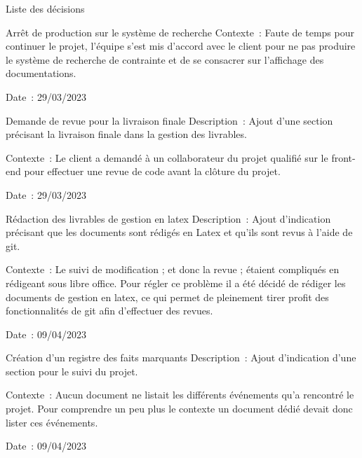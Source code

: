 \documentclass[]{article}
\begin{document}
{\begin{section}{Liste des décisions}
\begin{subsection}{Arrêt de production sur le système de recherche}
     Contexte : Faute de temps pour continuer le projet, l’équipe s’est mis d’accord avec le client pour ne pas produire le système de recherche de contrainte et de se consacrer sur l’affichage des documentations.

     Date : 29/03/2023
 \end{subsection}
 \newpage
 \begin{subsection}{Demande de revue pour la livraison finale}
     Description : Ajout d’une section précisant la livraison finale dans la gestion des livrables.

     Contexte : Le client a demandé à un collaborateur du projet qualifié sur le front-end pour effectuer une revue de code avant la clôture du projet.

     Date : 29/03/2023
 \end{subsection}

 \begin{subsection}{Rédaction des livrables de gestion en latex}
    Description : Ajout d'indication précisant que les documents sont rédigés en Latex et qu'ils sont revus à l'aide de git.

    Contexte : Le suivi de modification ; et donc la revue ; étaient compliqués en rédigeant sous libre office. Pour régler ce problème il a été décidé de rédiger les documents de gestion en latex, ce qui permet de pleinement tirer profit des fonctionnalités de git afin d'effectuer des revues.

    Date : 09/04/2023
\end{subsection}

\begin{subsection}{Création d'un registre des faits marquants}
    Description : Ajout d'indication d'une section pour le suivi du projet.

    Contexte : Aucun document ne listait les différents événements qu'a rencontré le projet. Pour comprendre un peu plus le contexte un document dédié devait donc lister ces événements.

    Date : 09/04/2023
\end{subsection}
\end{section}
}
\end{document}
